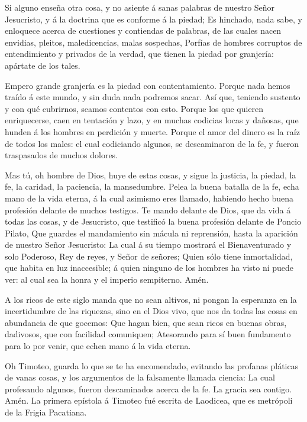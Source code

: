  Si alguno enseña otra cosa, y no asiente á sanas palabras
de nuestro Señor Jesucristo, y á la doctrina que es conforme á la
piedad;  Es hinchado, nada sabe, y enloquece acerca de
cuestiones y contiendas de palabras, de las cuales nacen envidias,
pleitos, maledicencias, malas sospechas,  Porfías de hombres
corruptos de entendimiento y privados de la verdad, que tienen la piedad
por granjería: apártate de los tales.

 Empero grande granjería es la piedad con contentamiento.
 Porque nada hemos traído á este mundo, y sin duda nada
podremos sacar.  Así que, teniendo sustento y con qué
cubrirnos, seamos contentos con esto.  Porque los que
quieren enriquecerse, caen en tentación y lazo, y en muchas codicias
locas y dañosas, que hunden á los hombres en perdición y muerte.
 Porque el amor del dinero es la raíz de todos los males:
el cual codiciando algunos, se descaminaron de la fe, y fueron
traspasados de muchos dolores.

 Mas tú, oh hombre de Dios, huye de estas cosas, y sigue la
justicia, la piedad, la fe, la caridad, la paciencia, la mansedumbre.
 Pelea la buena batalla de la fe, echa mano de la vida
eterna, á la cual asimismo eres llamado, habiendo hecho buena profesión
delante de muchos testigos.  Te mando delante de Dios, que
da vida á todas las cosas, y de Jesucristo, que testificó la buena
profesión delante de Poncio Pilato,  Que guardes el
mandamiento sin mácula ni reprensión, hasta la aparición de nuestro
Señor Jesucristo:  La cual á su tiempo mostrará el
Bienaventurado y solo Poderoso, Rey de reyes, y Señor de señores;
 Quien sólo tiene inmortalidad, que habita en luz
inaccesible; á quien ninguno de los hombres ha visto ni puede ver: al
cual sea la honra y el imperio sempiterno. Amén.

 A los ricos de este siglo manda que no sean altivos, ni
pongan la esperanza en la incertidumbre de las riquezas, sino en el Dios
vivo, que nos da todas las cosas en abundancia de que gocemos:
 Que hagan bien, que sean ricos en buenas obras, dadivosos,
que con facilidad comuniquen;  Atesorando para sí buen
fundamento para lo por venir, que echen mano á la vida eterna.

 Oh Timoteo, guarda lo que se te ha encomendado, evitando
las profanas pláticas de vanas cosas, y los argumentos de la falsamente
llamada ciencia:  La cual profesando algunos, fueron
descaminados acerca de la fe. La gracia sea contigo. Amén. La primera
epístola á Timoteo fué escrita de Laodicea, que es metrópoli de la
Frigia Pacatiana.
